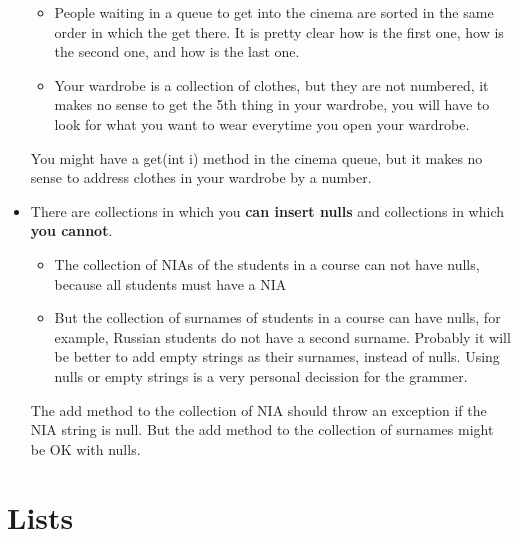 \documentclass[a4paper, 9pt]{extarticle}
\begin{document}
\begin{itemize}
    \begin{itemize}

      \item People waiting in a queue to get into the cinema are sorted in the same
        order in which the get there. It is pretty clear how is the first one, how
        is the second one, and how is the last one.

      \item Your wardrobe is a collection of clothes, but they are not
        numbered, it makes no sense to get the 5th thing in your wardrobe, you
        will have to look for what you want to wear everytime you open your
        wardrobe.

    \end{itemize}

    You might have a get(int i) method in the cinema queue, but it makes no
    sense to address clothes in your wardrobe by a number.

  \item There are collections in which you \textbf{can insert nulls} and collections in which \textbf{you cannot}.

    \begin{itemize}

      \item The collection of NIAs of the students in a course can not have nulls, because all students must have a NIA

      \item But the collection of surnames of students in a course can have
        nulls, for example, Russian students do not have a second surname.
        Probably it will be better to add empty strings as their surnames,
        instead of nulls. Using nulls or empty strings is a very personal
        decission for the grammer.

    \end{itemize}

    The add method to the collection of NIA should throw an exception if the
    NIA string is null. But the add method to the collection of surnames might
    be OK with nulls.

\end{itemize}






\section{Lists}
\end{document}
